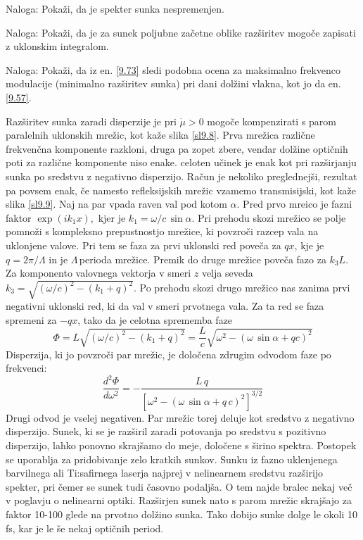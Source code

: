\documentclass[11pt,fleqn]{book} %
\begin{document}
Naloga: Pokaži, da je spekter sunka nespremenjen.

Naloga: Pokaži, da je za sunek poljubne začetne oblike razširitev
mogoče zapisati z uklonskim integralom.

Naloga: Pokaži, da iz en. \ref{9.73} sledi podobna ocena za maksimalno
frekvenco modulacije (minimalno razširitev sunka) pri dani dolžini
vlakna, kot jo da en. \ref{9.57}.

Razširitev sunka zaradi disperzije je pri $\dot{\mu}>0$ mogoče kompenzirati
s parom paralelnih uklonskih mrežic, kot kaže slika \ref{sl9.8}.
Prva mrežica različne frekvenčna komponente razkloni, druga pa zopet
zbere, vendar dolžine optičnih poti za različne komponente niso enake.
celoten učinek je enak kot pri razširjanju sunka po sredstvu z negativno
disperzijo. Račun je nekoliko preglednejši, rezultat pa povsem enak,
če namesto refleksijskih mrežic vzamemo transmisijski, kot kaže slika
\ref{sl9.9}. Naj na par vpada raven val pod kotom $\alpha.$ Pred
prvo mre\textquotedbl{}ico je fazni faktor $\exp\left(ik_{1}x\right),$
kjer je $k_{1}=\omega/c\,\sin\alpha$. Pri prehodu skozi mrežico se
polje pomnoži s kompleksno prepustnostjo mrežice, ki povzroči razcep
vala na uklonjene valove. Pri tem se faza za prvi uklonski red poveča
za $qx$, kje je $q=2\pi/\Lambda$ in je $\Lambda\,$perioda mrežice.
Premik do druge mrežice poveča fazo za $k_{3}L$. Za komponento valovnega
vektorja v smeri $z$ velja seveda $k_{3}=\sqrt{\left(\omega/c\right)^{2}-\left(k_{1}+q\right)^{2}}$.
Po prehodu skozi drugo mrežico nas zanima prvi negativni uklonski
red, ki da val v smeri prvotnega vala. Za ta red se faza spremeni
za $-qx$, tako da je celotna sprememba faze 
\begin{equation}
\Phi=L\sqrt{\left(\omega/c\right)^{2}-\left(k_{1}+q\right)^{2}}=\frac{L}{c}\sqrt{\omega^{2}-\left(\omega\,\sin\alpha+qc\right)^{2}}\label{9.75}
\end{equation}
 Disperzija, ki jo povzroči par mrežic, je določena zdrugim odvodom
faze po frekvenci: 
\begin{equation}
\frac{d^{2}\Phi}{d\omega^{2}}=-\frac{L\, q}{\left[\omega^{2}-\left(\omega\,\sin\alpha+q\, c\right)^{2}\right]^{3/2}}\label{9.76}
\end{equation}
 Drugi odvod je vselej negativen. Par mrežic torej deluje kot sredstvo
z negativno disperzijo. Sunek, ki se je razširil zaradi potovanja
po sredstvu s pozitivno disperzijo, lahko ponovno skrajšamo do meje,
določene s širino spektra. Postopek se uporablja za pridobivanje zelo
kratkih sunkov. Sunku iz fazno uklenjenega barvilnega ali Ti:safirnega
laserja najprej v nelinearnem sredstvu razširijo spekter, pri čemer
se sunek tudi časovno podaljša. O tem najde bralec nekaj več v poglavju
o nelinearni optiki. Razširjen sunek nato s parom mrežic skrajšajo
za faktor 10-100 glede na prvotno dolžino sunka. Tako dobijo sunke
dolge le okoli 10 fs, kar je le še nekaj optičnih period.
\end{document}

